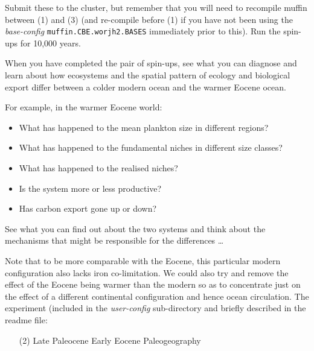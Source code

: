 \documentclass[11pt,fleqn]{book} %
\begin{document}
\noindent Submit these to the cluster, but remember that you will need to recompile muffin between (1) and (3) (and re-compile before (1) if you have not been using the \textit{base-config} \texttt{muffin.CBE.worjh2.BASES} immediately prior to this). Run the spin-ups for 10,000 years.

\vspace{2mm}
\noindent When you have completed the pair of spin-ups, see what you can diagnose and learn about how ecosystems and the spatial pattern of ecology and biological export differ between a colder modern ocean and the warmer Eocene ocean. 

For example, in the warmer Eocene world:

\vspace{1mm}
\begin{itemize}
\item What has happened to the mean plankton size in different regions?
\item What has happened to the fundamental niches in different size classes?
\item What has happened to the realised niches?
\item Is the system more or less productive?
\item Has carbon export gone up or down?
\end{itemize}
\vspace{1mm}

See what you can find out about the two systems and think about the mechanisms that might be responsible for the differences \dots

\vspace{8mm}
\pagebreak 

Note that to be more comparable with the Eocene, this particular modern configuration also lacks iron co-limitation. We could also try and remove the effect of the Eocene being warmer than the modern so as to concentrate just on the effect of a different continental configuration and hence ocean circulation. The experiment (included in the \textit{user-config} sub-directory and briefly described in the \textsf{\footnotesize readme } file:

\vspace{1mm}
\begin{itemize}[noitemsep]
\item[(2)] \textsf{\footnotesize Late Paleocene Early Eocene Paleogeography}
\end{itemize}
\vspace{1mm}
\end{document}
